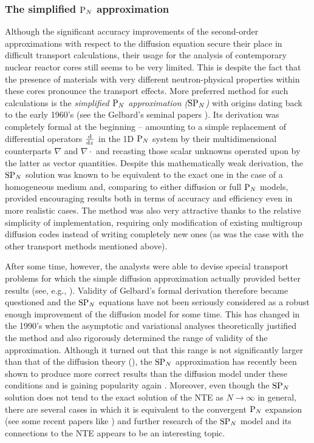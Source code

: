 \subsubsection{The simplified $\text{P}_{N}$ approximation}

Although the significant accuracy improvements of the second-order approximations with respect to the diffusion equation
secure their place in difficult transport calculations, their usage for the analysis of contemporary nuclear reactor
cores still seems to be very limited. This is despite the fact that the presence of materials with very different
neutron-physical properties within these cores%
pronounce the transport effects. More preferred method for such calculations is the \textit{simplified $\text{P}_{N}$
approximation ($\text{SP}_{N}$)} with origins dating back to the early 1960's (see the Gelbard's seminal papers
\cite{Gelbard1,Gelbard2}). Its derivation was completely formal at the beginning -- amounting to a simple replacement of
differential operators $\textstyle\frac{\text{d}^{}{}}{\text{d} {z}^{}}$ in the 1D $\text{P}_{N}$ system by their multidimensional counterparts $\nabla$ and
$\nabla\cdot$ and recasting those scalar unknowns operated upon by the latter as vector quantities. Despite this
mathematically weak derivation, the $\text{SP}_{N}$ solution was known to be equivalent to the exact one in the case of a
homogeneous medium and, comparing to either diffusion or full $\text{P}_{N}$ models, provided encouraging results both in terms
of accuracy and efficiency even in more realistic cases. The method was also very attractive thanks to the relative
simplicity of implementation, requiring only modification of existing multigroup diffusion codes instead of writing
completely new ones (as was the case with the other transport methods mentioned above).

After some time, however, the analysts were able to devise special transport problems for which the simple diffusion
approximation actually provided better results (see, e.g., \cite[p. 247]{Coppa1}). Validity of Gelbard's formal
derivation therefore became questioned and the $\text{SP}_{N}$ equations have not been seriously considered as a robust enough
improvement of the diffusion model for some time. This has changed in the 1990's when the asymptotic and variational
analyses \cite{Larsen1,Brantley1,Pomraning1} theoretically justified the method and also rigorously determined the range
of validity of the approximation. Although it turned out that this range is not significantly larger than that of the
diffusion theory (\cite{Larsen1}), the $\text{SP}_{N}$ approximation has recently been shown to produce more correct results than
the diffusion model under these conditions and is gaining popularity again
\cite{Frank1,McClarren1,Ragusa1,Larsen3,Kirschenmann1}. Moreover, even though the $\text{SP}_{N}$ solution does not tend to the
exact solution of the NTE as $N\to\infty$ in general, there are several cases in which it is equivalent to the
convergent $\text{P}_{N}$ expansion (see some recent papers like \cite{Coppa2,McClarren2,Larsen2}) and further research of the
$\text{SP}_{N}$ model and its connections to the NTE appears to be an interesting topic.
